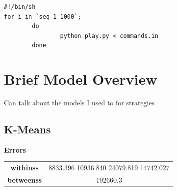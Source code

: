 \documentclass[11pt, oneside]{article}   	%
\begin{document}
\begin{verbatim}
#!/bin/sh
for i in `seq 1 1000`;
        do
                python play.py < commands.in
        done
\end{verbatim}


\section{Brief Model Overview}

Can talk about the models I used to for strategies

\subsection{K-Means}

\textbf{Errors}\\

\begin{center}
\begin{tabular}{||c | c ||}
\hline
 \textbf{withinss} & 8833.396 10936.840 24079.819 14742.027 \\ 
 \textbf{betweenss} & 192660.3 \\  
 \hline
\end{tabular}
\end{center}
\end{document}
